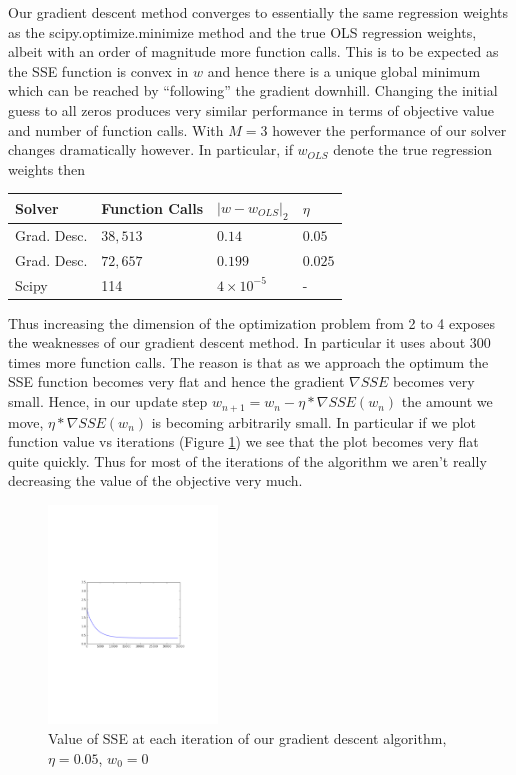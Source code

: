 \documentclass{article}
\begin{document}
Our gradient descent method converges to essentially the same regression weights as the scipy.optimize.minimize method and the true OLS regression weights, albeit with an order of magnitude more function calls. This is to be expected as the SSE function is convex in $w$ and hence there is a unique global minimum which can be reached by ``following'' the gradient downhill. Changing the initial guess to all zeros produces very similar performance in terms of objective value and number of function calls. With $M=3$ however the performance of our solver changes dramatically however. In particular, if $w_{OLS}$ denote the true regression weights then

\begin{tabular}{|l|l|l|l|}
\hline
Solver & Function Calls & $|w - w_{OLS}|_2$ & $\eta$ \\ \hline
Grad. Desc. & $38,513$ & $0.14$ & $0.05$ \\ \hline
Grad. Desc. & $72, 657$ & $0.199$ & $0.025$ \\ \hline
Scipy & 114 & $4\times 10^{-5}$ & - \\ \hline
\end{tabular}
%
%

Thus increasing the dimension of the optimization problem from 2 to 4 exposes the weaknesses of our gradient descent method. In particular it uses about $300$ times more function calls. The reason is that as we approach the optimum the SSE function becomes very flat and hence the gradient $\nabla SSE$ becomes very small. Hence, in our update step $w_{n+1} = w_n - \eta*\nabla SSE(w_n)$ the amount we move, $\eta*\nabla SSE(w_n)$ is becoming arbitrarily small. In particular if we plot function value vs iterations (Figure \ref{grad-descent-iterations}) we see that the plot becomes very flat quite quickly. Thus for most of the iterations of the algorithm we aren't really decreasing the value of the objective very much. 

\begin{figure}[h]
\centering
\includegraphics[width=0.4\textwidth]{lin-reg-fig-1}
\caption{Value of SSE at each iteration of our gradient descent algorithm, $\eta = 0.05$, $w_0 = 0$}
\label{grad-descent-iterations}
\end{figure}
\end{document}
